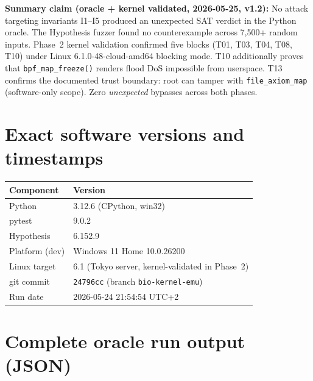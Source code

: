 \documentclass[11pt,a4paper]{article}
\theoremstyle{definition}
\begin{document}
\begin{resultbox}
\textbf{Summary claim (oracle + kernel validated, 2026-05-25, v1.2):}
No attack targeting invariants I1–I5 produced an unexpected SAT verdict in
the Python oracle. The Hypothesis fuzzer found no counterexample across 7,500+
random inputs. Phase~2 kernel validation confirmed five blocks (T01, T03, T04, T08, T10)
under Linux 6.1.0-48-cloud-amd64 blocking mode. T10 additionally proves that
\texttt{bpf\_map\_freeze()} renders flood DoS impossible from userspace.
T13 confirms the documented trust boundary: root can tamper with \texttt{file\_axiom\_map}
(software-only scope). Zero \emph{unexpected} bypasses across both phases.
\end{resultbox}

\appendix

\section{Exact software versions and timestamps}
\label{app:versions}

\begin{center}
\begin{tabular}{ll}
\toprule
Component & Version \\
\midrule
Python                & 3.12.6 (CPython, win32) \\
pytest                & 9.0.2 \\
Hypothesis            & 6.152.9 \\
Platform (dev)        & Windows 11 Home 10.0.26200 \\
Linux target          & 6.1 (Tokyo server, kernel-validated in Phase~2) \\
git commit            & \texttt{24796cc} (branch \texttt{bio-kernel-emu}) \\
Run date              & 2026-05-24 21:54:54 UTC+2 \\
\bottomrule
\end{tabular}
\end{center}

\section{Complete oracle run output (JSON)}
\label{app:json}
\end{document}
